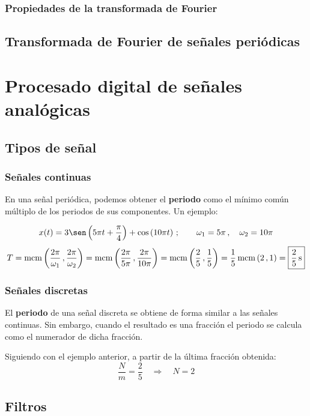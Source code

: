 \documentclass[a4paper,oneside]{book}
\begin{document}
\subsection{Propiedades de la transformada de Fourier}

\section{Transformada de Fourier de señales periódicas}

\chapter{Procesado digital de señales analógicas}

\section{Tipos de señal} \vspace{\parskip}

\subsection{Señales continuas}

En una señal periódica, podemos obtener el \textbf{periodo} como el mínimo común múltiplo de los periodos de sus componentes. Un ejemplo:

\[ x(t) = 3 \sen \left( 5\pi t + \frac{\pi}{4} \right) + \cos \left( 10\pi t \right)\, ;\qquad \omega_1 = 5\pi \, , \quad \omega_2 = 10\pi \]
\[ T = \mcm \left( \frac{2\pi}{\omega_1} \, , \frac{2\pi}{\omega_2} \right) = \mcm \left( \frac{2\pi}{5\pi} \, , \frac{2\pi}{10\pi} \right) = \mcm \left( \frac{2}{5} \, , \frac{1}{5} \right) = \frac{1}{5} \mcm \left( 2 \, , 1 \right) = \boxed{\frac{2}{5} \, \unit{\s}}\]

\subsection{Señales discretas}

El \textbf{periodo} de una señal discreta se obtiene de forma similar a las señales continuas. Sin embargo, cuando el resultado es una fracción el periodo se calcula como el numerador de dicha fracción.

Siguiendo con el ejemplo anterior, a partir de la última fracción obtenida:
\[ \frac{N}{m} = \frac{2}{5} \quad \Longrightarrow \quad \boxed{N = 2} \]

\section{Filtros}
\end{document}
